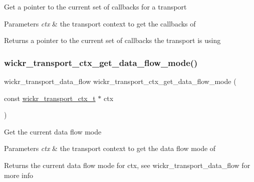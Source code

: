 Get a pointer to the current set of callbacks for a transport


\begin{DoxyParams}{Parameters}
{\em ctx} & the transport context to get the callbacks of \\
\hline
\end{DoxyParams}
\begin{DoxyReturn}{Returns}
a pointer to the current set of callbacks the transport is using 
\end{DoxyReturn}
\mbox{\label{group__wickr__transport__ctx_gaffad367319e17f62046cde388ccd8802}} 
\subsubsection{\texorpdfstring{wickr\_transport\_ctx\_get\_data\_flow\_mode()}{wickr\_transport\_ctx\_get\_data\_flow\_mode()}}
{\footnotesize\ttfamily wickr\+\_\+transport\+\_\+data\+\_\+flow wickr\+\_\+transport\+\_\+ctx\+\_\+get\+\_\+data\+\_\+flow\+\_\+mode (\begin{DoxyParamCaption}\item[{const \mbox{\hyperlink{structwickr__transport__ctx}{wickr\+\_\+transport\+\_\+ctx\+\_\+t}} $\ast$}]{ctx }\end{DoxyParamCaption})}

Get the current data flow mode


\begin{DoxyParams}{Parameters}
{\em ctx} & the transport context to get the data flow mode of \\
\hline
\end{DoxyParams}
\begin{DoxyReturn}{Returns}
the current data flow mode for \textquotesingle{}ctx\textquotesingle{}, see \textquotesingle{}wickr\+\_\+transport\+\_\+data\+\_\+flow\textquotesingle{} for more info 
\end{DoxyReturn}
\mbox{\label{group__wickr__transport__ctx_ga7bcb60a2739744e08cce0c18ce7f01ba}} 

